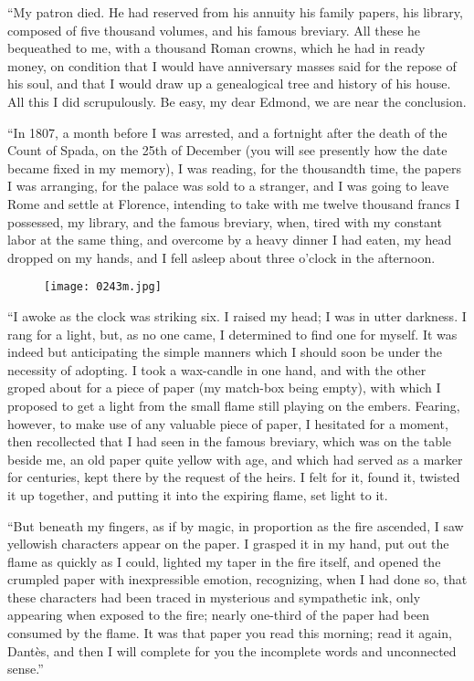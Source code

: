 “My patron died. He had reserved from his annuity his family papers,
his library, composed of five thousand volumes, and his famous
breviary. All these he bequeathed to me, with a thousand Roman crowns,
which he had in ready money, on condition that I would have anniversary
masses said for the repose of his soul, and that I would draw up a
genealogical tree and history of his house. All this I did
scrupulously. Be easy, my dear Edmond, we are near the conclusion.

“In 1807, a month before I was arrested, and a fortnight after the
death of the Count of Spada, on the 25th of December (you will see
presently how the date became fixed in my memory), I was reading, for
the thousandth time, the papers I was arranging, for the palace was
sold to a stranger, and I was going to leave Rome and settle at
Florence, intending to take with me twelve thousand francs I possessed,
my library, and the famous breviary, when, tired with my constant labor
at the same thing, and overcome by a heavy dinner I had eaten, my head
dropped on my hands, and I fell asleep about three o’clock in the
afternoon.

\begin{figure}[ht]
\texttt{[image: 0243m.jpg]}
\end{figure}

“I awoke as the clock was striking six. I raised my head; I was in
utter darkness. I rang for a light, but, as no one came, I determined
to find one for myself. It was indeed but anticipating the simple
manners which I should soon be under the necessity of adopting. I took
a wax-candle in one hand, and with the other groped about for a piece
of paper (my match-box being empty), with which I proposed to get a
light from the small flame still playing on the embers. Fearing,
however, to make use of any valuable piece of paper, I hesitated for a
moment, then recollected that I had seen in the famous breviary, which
was on the table beside me, an old paper quite yellow with age, and
which had served as a marker for centuries, kept there by the request
of the heirs. I felt for it, found it, twisted it up together, and
putting it into the expiring flame, set light to it.

“But beneath my fingers, as if by magic, in proportion as the fire
ascended, I saw yellowish characters appear on the paper. I grasped it
in my hand, put out the flame as quickly as I could, lighted my taper
in the fire itself, and opened the crumpled paper with inexpressible
emotion, recognizing, when I had done so, that these characters had
been traced in mysterious and sympathetic ink, only appearing when
exposed to the fire; nearly one-third of the paper had been consumed by
the flame. It was that paper you read this morning; read it again,
Dantès, and then I will complete for you the incomplete words and
unconnected sense.”

